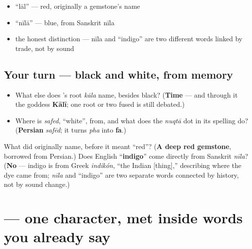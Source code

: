\begin{itemize}
\raggedright
  \item \textquotedblleft{}lāl\textquotedblright{} — red, originally a gemstone's name
  \item \textquotedblleft{}nīlā\textquotedblright{} — blue, from Sanskrit nīla
  \item the honest distinction — nīla and \textquotedblleft{}indigo\textquotedblright{} are two different words linked by trade, not by sound
\end{itemize}

\subsection*{Your turn — black and white, from memory}
\begin{itemize}
\raggedright
  \item What else does \textbf{}'s root \textbf{} \emph{kāla} name, besides black? (\textbf{Time} — and through it the goddess \textbf{Kālī}; one root or two fused is still debated.)
  \item Where is \emph{safed}, \textquotedblleft{}white\textquotedblright{}, from, and what does the \emph{nuqtā} dot in its spelling do? (\textbf{Persian} \emph{safēd}; it turns \emph{pha} into \textbf{fa}.)
\end{itemize}

\begin{tcolorbox}[breakable,colback=teal!4,colframe=teal!35!black,title={Before you move on}]
What did \textbf{} originally name, before it meant \textquotedblleft{}red\textquotedblright{}? (\textbf{A deep red gemstone}, borrowed from Persian.) Does English \textquotedblleft{}\textbf{indigo}\textquotedblright{} come directly from Sanskrit \textbf{} \emph{nīla}? (\textbf{No} — indigo is from Greek \emph{indikón}, \textquotedblleft{}the Indian {[}thing{]},\textquotedblright{} describing where the dye came from; \emph{nīla} and \textquotedblleft{}indigo\textquotedblright{} are two separate words connected by history, not by sound change.)
\end{tcolorbox}
\section[\texorpdfstring{\hi{ा} (ā)}{ा (ā)}]{ — one character, met inside words you already say}

\label{lesson:HI-S06-vowel-sign-aa}




